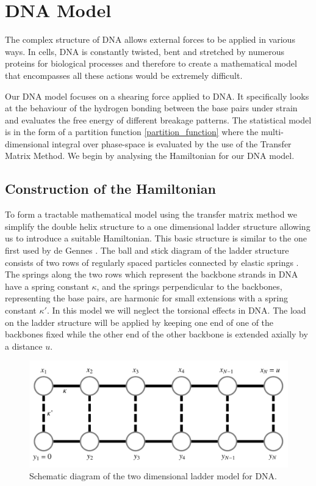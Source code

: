 \chapter{DNA Model}

The complex structure of DNA allows external forces to be applied in various ways. In cells, DNA is constantly twisted, bent and stretched by numerous proteins for biological processes and therefore to create a mathematical model that encompasses all these actions would be extremely difficult.

Our DNA model focuses on a shearing force applied to DNA. It specifically looks at the behaviour of the hydrogen bonding between the base pairs under strain and evaluates the free energy of different breakage patterns. The statistical model is in the form of a partition function \eqref{partition_function} where the multi-dimensional integral over phase-space is evaluated by the use of the Transfer Matrix Method. We begin by analysing the Hamiltonian for our DNA model.

\section{Construction of the Hamiltonian}

To form a tractable mathematical model using the transfer matrix method we simplify the double helix structure to a one dimensional ladder structure allowing us to introduce a suitable Hamiltonian. This basic structure is similar to the one first used by de Gennes \cite{DeGennes2001}. The ball and stick diagram of the ladder structure consists of two rows of regularly spaced particles connected by elastic springs . The springs along the two rows which represent the backbone strands in DNA have a spring constant $\kappa$, and the springs perpendicular to the backbones, representing the base pairs, are harmonic for small extensions with a spring constant $\kappa'$. In this model we will neglect the torsional effects in DNA. The load on the ladder structure will be applied by keeping one end of one of the backbones fixed while the other end of the other backbone is extended axially by a distance $u$.

\begin{figure}
\centering \includegraphics[scale=0.3]{Graphics/DNA_Model/dna_model_ladder.pdf}
\caption{Schematic diagram of the two dimensional ladder model for DNA.}
\label{fig:dna_model_ladder}
\end{figure}

